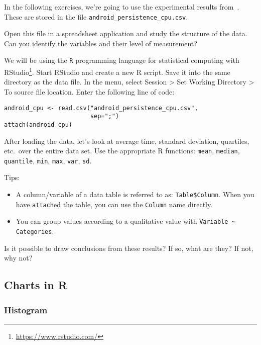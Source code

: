 \begin{exercise}
  In the following exercises, we're going to use the experimental results from~\textcite{Akin2016}. These are stored in the file \texttt{android\_persistence\_cpu.csv}.

  Open this file in a spreadsheet application and study the structure of the data. Can you identify the variables and their level of measurement?

  We will be using the \texttt{R} programming language for statistical computing with RStudio\footnote{\url{https://www.rstudio.com/}}. Start RStudio and create a new R script. Save it into the same directory as the data file. In the menu, select Session > Set Working Directory > To source file location. Enter the following line of code:

\begin{lstlisting}
android_cpu <- read.csv("android_persistence_cpu.csv",
                        sep=";")
attach(android_cpu)
\end{lstlisting}

After loading the data, let's look at average time, standard deviation, quartiles, etc.~over the entire data set. Use the appropriate R functions: \texttt{mean}, \texttt{median}, \texttt{quantile}, \texttt{min}, \texttt{max}, \texttt{var}, \texttt{sd}.

Tips:

\begin{itemize}
  \item A column/variable of a data table is referred to as: \verb|Table$Column|. When you have \verb|attach|ed the table, you can use the \verb|Column| name directly.
  \item You can group values according to a qualitative value with \verb|Variable ~ Categories|.
\end{itemize}
\end{exercise}

\begin{exercise}
Is it possible to draw conclusions from these results? If so, what are they? If not, why not?
\end{exercise}

\subsection{Charts in R}
\subsubsection{Histogram}

